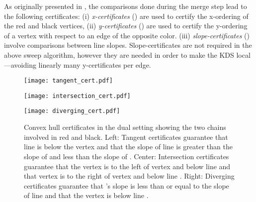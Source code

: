 \documentclass[11pt]{article}
\begin{document}
As originally presented in \cite{Basch99MobileData}, the comparisons
done during the merge step lead to the following certificates:
(i) \emph{x-certificates} () are used to certify the x-ordering of
the red and black vertices, (ii) \emph{y-certificates} () are
used to certify the y-ordering of a vertex with respect to an edge of
the opposite color. (iii) \emph{slope-certificates} () involve
comparisons between line slopes. Slope-certificates are not required
in the above sweep algorithm, however they are needed in order to make
the KDS local---avoiding linearly many y-certificates per edge.

\begin{figure*}[!ht]  
\begin{minipage}{0.3\textwidth}
\begin{center}
\texttt{[image: tangent\_cert.pdf]}
\end{center}
\end{minipage}
\begin{minipage}{0.3\textwidth}
\begin{center}
\texttt{[image: intersection\_cert.pdf]}
\end{center}
\end{minipage}
\begin{minipage}{0.3\textwidth}
\begin{center}
\texttt{[image: diverging\_cert.pdf]}
\end{center}
\end{minipage}
\caption{Convex hull certificates \cite{Basch99MobileData} in the dual setting showing the two chains involved in red and black.  Left: Tangent certificates guarantee that line  is below the vertex  and that the slope of line  is greater than the slope of  and less than the slope of .  Center: Intersection certificates guarantee that the vertex  is to the left of vertex  and below line  and that vertex  is to the right of vertex  and below line .  Right: Diverging certificates guarantee that 's slope is less than or equal to the slope of line  and that the vertex  is below line .  
}
\label{fig:certificate_types}
\end{figure*}
\end{document}
